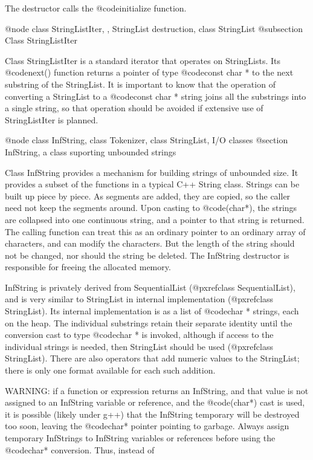 The destructor calls the @code{initialize} function.

@node class StringListIter,  , StringList destruction, class StringList
@subsection Class StringListIter

Class StringListIter is a standard iterator that operates on
StringLists.  Its @code{next()} function returns a pointer of type
@code{const char *} to the next substring of the StringList.
It is important to know that the operation of converting a
StringList to a @code{const char *} string joins all the substrings into
a single string, so that operation should be avoided if extensive
use of StringListIter is planned.

@node class InfString, class Tokenizer, class StringList, I/O classes
@section InfString, a class suporting unbounded strings

Class InfString provides a mechanism for building strings
of unbounded size.  It provides a subset of the functions in a
typical C++ String class.  Strings can be built up piece by piece.
As segments are added, they are copied, so the caller
need not keep the segments around.
Upon casting to @code{(char*)}, the strings are collapsed into
one continuous string, and a pointer to that string is returned.
The calling function can treat this as an ordinary pointer to an ordinary
array of characters, and can modify the characters.
But the length of the string should not be changed, nor
should the string be deleted.
The InfString destructor is responsible for freeing the allocated memory.

InfString is privately
derived from SequentialList (@pxref{class SequentialList}),
and is very similar to StringList in internal implementation
(@pxref{class StringList}).  Its internal implementation is as a
list of @code{char *} strings, each on the heap.
The individual substrings retain their separate identity
until the conversion cast to type @code{char *} is invoked,
although if access to the individual strings is needed, then StringList
should be used (@pxref{class StringList}).
There are also operators that add numeric values to the StringList;
there is only one format available for each such addition.

WARNING: if a function or expression returns an InfString, and
that value is not assigned to an InfString variable or reference,
and the @code{(char*)} cast is used, it is possible (likely under
g++) that the InfString temporary will be destroyed too soon,
leaving the @code{char*} pointer pointing to garbage.  Always
assign temporary InfStrings to InfString variables or references
before using the @code{char*} conversion.  Thus, instead of

